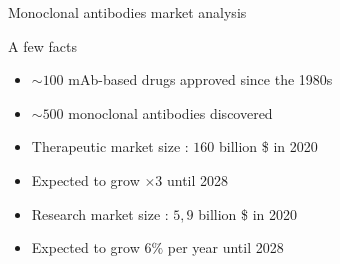 \begin{frame}{Monoclonal antibodies market analysis}
    \begin{block}{A few facts}
        \begin{itemize}
            \item $\sim 100$ mAb-based drugs approved since the 1980s
            \item $\sim 500$ monoclonal antibodies discovered
            \item Therapeutic market size : $160$ billion \$ in 2020
            \item[] Expected to grow $\times 3$ until 2028
            \item Research market size : $5,9$ billion \$ in 2020 
            \item[] Expected to grow $6 \%$ per year until 2028 
        \end{itemize}
    \end{block}
\end{frame}